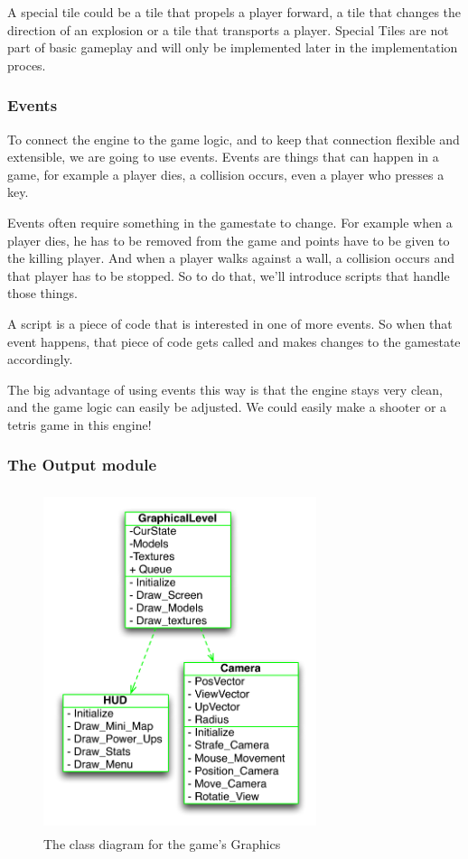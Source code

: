           A special tile could be a tile that propels a player forward, a tile that changes the direction of an explosion or a tile that transports a player. Special Tiles are not part of basic gameplay and will only be implemented later in the implementation proces.

    \subsubsection{Events} %
    \label{ssub:events}
        To connect the engine to the game logic, and to keep that connection flexible and extensible, we are going to use events.
        Events are things that can happen in a game, for example a player dies, a collision occurs, even a player who presses a key.

        Events often require something in the gamestate to change. For example when a player dies, he has to be removed from the game and points have to be given to the killing player. And when a player walks against a wall, a collision occurs and that player has to be stopped. So to do that, we'll introduce scripts that handle those things.

        A script is a piece of code that is interested in one of more events. So when that event happens, that piece of code gets called and makes changes to the gamestate accordingly.

        The big advantage of using events this way is that the engine stays very clean, and the game logic can easily be adjusted. We could easily make a shooter or a tetris game in this engine!


      \newpage
      \subsubsection{The Output module} %
      \label{ssub:the_output_module}

      \begin{figure}[!ht]
         \centering
         \includegraphics[width=8cm,height=10cm]{diagrams/UML_output}
         \caption{The class diagram for the game's Graphics}
         \label{fig:UML_output}
       \end{figure}

